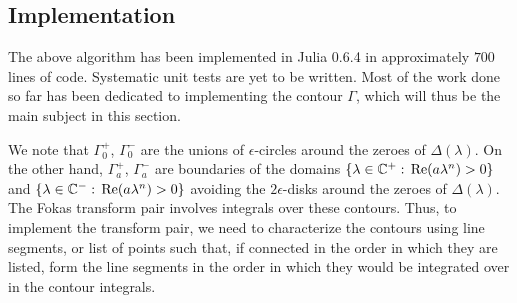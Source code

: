 \documentclass[11pt, oneside, a4paper]{article}
\begin{document}
\subsection{Implementation}
The above algorithm has been implemented in Julia 0.6.4 in approximately $700$ lines of code. Systematic unit tests are yet to be written. Most of the work done so far has been dedicated to implementing the contour $\Gamma$, which will thus be the main subject in this section.

We note that $\Gamma_0^+$, $\Gamma_0^-$ are the unions of $\epsilon$-circles around the zeroes of $\Delta(\lambda)$. On the other hand, $\Gamma_a^+$, $\Gamma_a^-$ are boundaries of the domains $\{\lambda\in \mathbb C^+:\,\mathrm{Re}(a\lambda^n)>0\}$ and $\{\lambda\in \mathbb C^-:\,\mathrm{Re}(a\lambda^n)>0\}$ avoiding the $2\epsilon$-disks around the zeroes of $\Delta(\lambda)$. The Fokas transform pair involves integrals over these contours. Thus, to implement the transform pair, we need to characterize the contours using line segments, or list of points such that, if connected in the order in which they are listed, form the line segments in the order in which they would be integrated over in the contour integrals.
\end{document}
